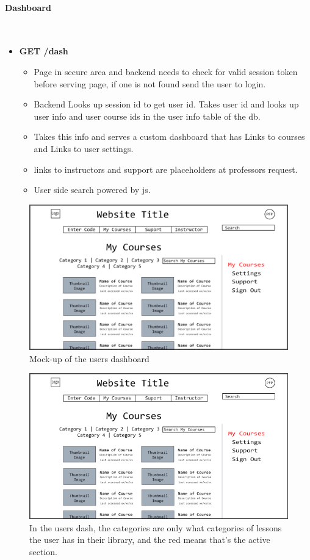 \documentclass{article}
\begin{document}
\paragraph{Dashboard}\\
\begin{itemize}
    \item \textbf{GET /dash}
        \begin{itemize}
        \item Page in secure area and backend needs to check for valid session
            token before serving page, if one is not found send the user to
                login.
        \item Backend Looks up session id to get user id. Takes user id and
            looks up user info and user course ids in the user info table of
                the db.
        \item Takes this info and serves a custom dashboard that has Links to
            courses and Links to user settings.
        \item links to instructors and support are placeholders at professors request.
        \item User side search powered by js.
    \end{itemize}
\end{itemize}
\begin{figure}[h!]
    \caption{Mock-up of the users dashboard}
    \includegraphics[width=\textwidth]{user_page}
\end{figure}
\begin{figure}[h!]
    \caption{In the users dash, the categories are only what categories of
    lessons the user has in their library, and the red means that's the active
    section.}
    \includegraphics[width=\textwidth]{user_page_red}
\end{figure}
\end{document}
